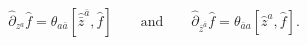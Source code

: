 \begin{equation}\label{der1}
 \hat{\partial}_{z^a}\hat{f}=
    \theta_{a\bar{a}}[\hat{\bar{z}}^{\bar{a}},\hat{f}]
 \qquad\text{and}\qquad
 \hat{\partial}_{\bar{z}^{\bar{a}}}\hat{f}=
    \theta_{\bar{a}a}[\hat{z}^a,\hat{f}].
\end{equation}

